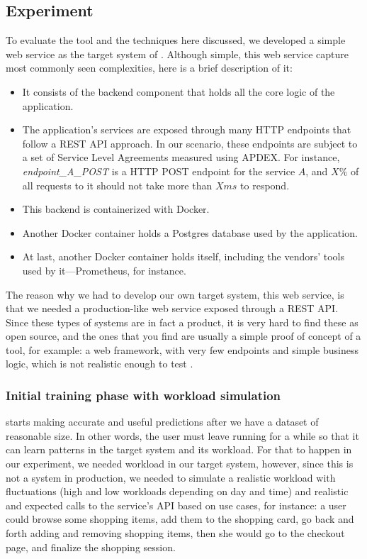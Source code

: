 \subsection{Experiment}

To evaluate the tool and the techniques here discussed, we developed a simple web service as the target system of \projectname{}. Although simple, this web service capture most commonly seen complexities, here is a brief description of it:

\begin{itemize}
  \item It consists of the backend component that holds all the core logic of the application.
  \item The application's services are exposed through many HTTP endpoints that follow a REST API approach. In our scenario, these endpoints are subject to a set of Service Level Agreements measured using APDEX. For instance, \textit{endpoint\_A\_POST} is a HTTP POST endpoint for the service $A$, and $X\%$ of all requests to it should not take more than $X ms$ to respond.
  \item This backend is containerized with Docker.
  \item Another Docker container holds a Postgres database used by the application.
  \item At last, another Docker container holds \projectname{} itself, including the vendors' tools used by it---Prometheus, for instance.
\end{itemize}

The reason why we had to develop our own target system, this web service, is that we needed a production-like web service exposed through a REST API. Since these types of systems are in fact a product, it is very hard to find these as open source, and the ones that you find are usually a simple proof of concept of a tool, for example: a web framework, with very few endpoints and simple business logic, which is not realistic enough to test \projectname{}.

\subsubsection{Initial training phase with workload simulation}


\projectname{} starts making accurate and useful predictions after we have a dataset of reasonable size. In other words, the user must leave \projectname{} running for a while so that it can learn patterns in the target system and its workload. For that to happen in our experiment, we needed workload in our target system, however, since this is not a system in production, we needed to simulate a realistic workload with fluctuations (high and low workloads depending on day and time) and realistic and expected calls to the service's API based on use cases, for instance: a user could browse some shopping items, add them to the shopping card, go back and forth adding and removing shopping items, then she would go to the checkout page, and finalize the shopping session.

